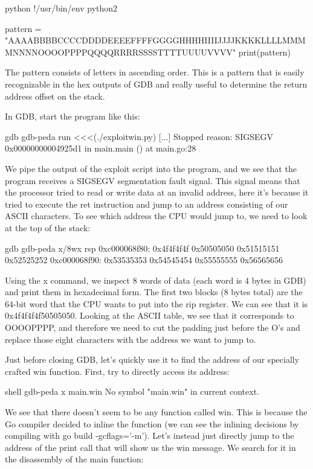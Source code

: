 python
!/usr/bin/env python2

pattern = "AAAABBBBCCCCDDDDEEEEFFFFGGGGHHHHIIIIJJJJKKKKLLLLMMMMNNNNOOOOPPPPQQQQRRRRSSSSTTTTUUUUVVVV"
print(pattern)


The pattern consists of letters in ascending order. This is a pattern that is easily recognizable in the hex outputs
of GDB and really useful to determine the return address offset on the stack.

In GDB, start the program like this:

gdb
gdb-peda run <<<(./exploitwin.py)
[...]
Stopped reason: SIGSEGV
0x00000000004925d1 in main.main () at main.go:28


We pipe the output of the exploit script into the program, and we see that the program receives a SIGSEGV segmentation
fault signal. This signal means that the processor tried to read or write data at an invalid address, here it's because
it tried to execute the ret instruction and jump to an address consisting of our ASCII characters. To see
which address the CPU would jump to, we need to look at the top of the stack:

gdb
gdb-peda x/8wx rsp
0xc000068f80:	0x4f4f4f4f	0x50505050	0x51515151	0x52525252
0xc000068f90:	0x53535353	0x54545454	0x55555555	0x56565656


Using the x command, we inspect 8 words of data (each word is 4 bytes in GDB) and print them in hexadecimal form. The
first two blocks (8 bytes total) are the 64-bit word that the CPU wants to put into the rip register. We
can see that it is 0x4f4f4f4f50505050. Looking at the ASCII table, we see that it corresponds to OOOOPPPP, and
therefore we need to cut the padding just before the O's and replace those eight characters with the address we want to
jump to.

Just before closing GDB, let's quickly use it to find the address of our specially crafted win function. First, try
to directly access its address:

shell
gdb-peda x main.win
No symbol "main.win" in current context.


We see that there doesn't seem to be any function called win. This is because the Go compiler decided to inline the
function (we can see the inlining decisions by compiling with go build -gcflags='-m'). Let's instead just directly
jump to the address of the print call that will show us the win message. We search for it in the disassembly of the
main function:

